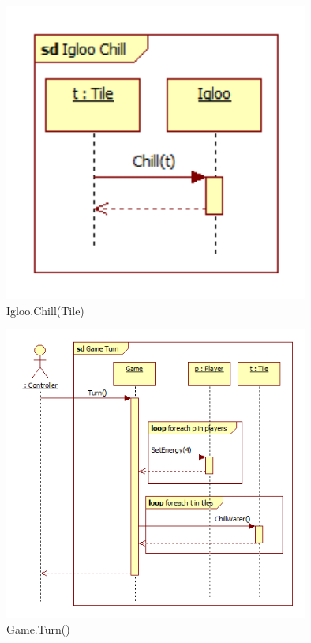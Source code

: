 \begin{figure}[H]
	\begin{center}
		\includegraphics[width=10cm]{chapters/chapter03/seqdiag/Igloo_Chill.png}
		\caption{Igloo.Chill(Tile)}
		\label{fig:IglooChill}
	\end{center}
\end{figure}
\begin{figure}[H]
	\begin{center}
		\includegraphics[width=10cm]{chapters/chapter03/seqdiag/Game_Turn.png}
		\caption{Game.Turn()}
		\label{fig:GameTurn}
	\end{center}
\end{figure}
